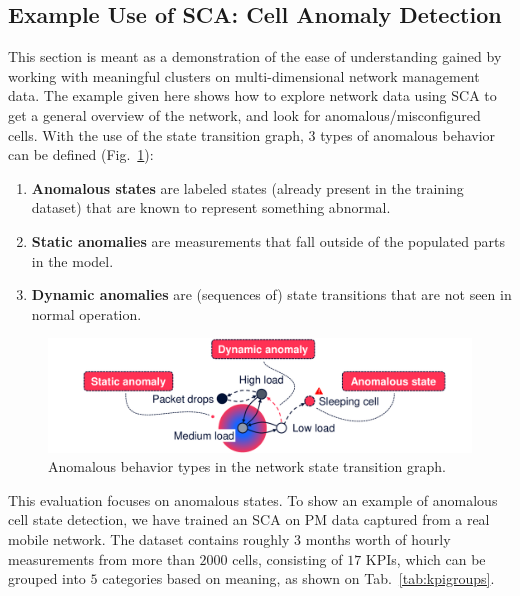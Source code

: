 		\subsection{Example Use of SCA: Cell Anomaly Detection }
			
			This section is meant as a demonstration of the ease of understanding gained by working with meaningful clusters on multi-dimensional network management data.
			The example given here shows how to explore network data using \ac{SCA} to get a general overview of the network, and look for anomalous/misconfigured cells.
			With the use of the state transition graph, $3$ types of anomalous behavior can be defined (Fig.~\ref{fig:stategraph_anomalies}):
			\begin{enumerate}
				\item
					\textbf{Anomalous states} are labeled states (already present in the training dataset) that are known to represent something abnormal.
					
				\item
					\textbf{Static anomalies} are measurements that fall outside of the populated parts in the model.
					
				\item
					\textbf{Dynamic anomalies} are (sequences of) state transitions that are not seen in normal operation.
			\end{enumerate}
			
			\begin{figure}[ht]
				\centering
				\includegraphics[width=\linewidth]{figures/06_sparse_clust/stategraph_anomalies/stategraph_anomalies.pdf}
				\caption[Anomalous behavior types in the network state transition graph]{Anomalous behavior types in the network state transition graph.}
				\label{fig:stategraph_anomalies}
			\end{figure}
			
			This evaluation focuses on anomalous states.
			To show an example of anomalous cell state detection, we have trained an \ac{SCA} on \ac{PM} data captured from a real mobile network.
			The dataset contains roughly $3$ months worth of hourly measurements from more than $2000$ cells, consisting of $17$ \acp{KPI}, which can be grouped into $5$ categories based on meaning, as shown on Tab.~\ref{tab:kpigroups}.
			
